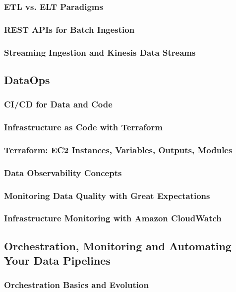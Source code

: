 \subsubsection{ETL vs. ELT Paradigms}
\subsubsection{REST APIs for Batch Ingestion}
\subsubsection{Streaming Ingestion and Kinesis Data Streams}

\subsection{DataOps}
\subsubsection{CI/CD for Data and Code}
\subsubsection{Infrastructure as Code with Terraform}
\subsubsection{Terraform: EC2 Instances, Variables, Outputs, Modules}
\subsubsection{Data Observability Concepts}
\subsubsection{Monitoring Data Quality with Great Expectations}
\subsubsection{Infrastructure Monitoring with Amazon CloudWatch}

\subsection{Orchestration, Monitoring and Automating Your Data Pipelines}
\subsubsection{Orchestration Basics and Evolution}
